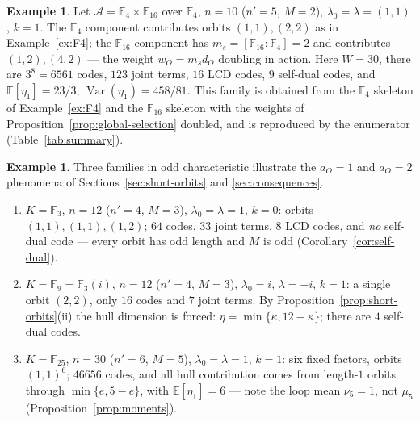 \documentclass[11pt,a4paper]{article}
\newcommand{\F}{\mathbb F}
\newcommand{\A}{\mathcal A}
\numberwithin{equation}{section}
\theoremstyle{plain}
\theoremstyle{definition}
\newtheorem{example}[theorem]{Example}
\theoremstyle{remark}
\begin{document}
\begin{example}\label{ex:mixed}
Let $\A=\F_4\times\F_{16}$ over $\F_4$, $n=10$ ($n'=5$, $M=2$),
$\lambda_0=\lambda=(1,1)$, $k=1$.  The $\F_4$ component contributes orbits
$(1,1),(2,2)$ as in Example~\ref{ex:F4}; the $\F_{16}$ component has
$m_s=[\F_{16}:\F_4]=2$ and contributes $(1,2),(4,2)$ --- the weight
$w_O=m_sd_O$ doubling in action.  Here $W=30$, there are $3^8=6561$ codes,
$123$ joint terms, $16$ LCD codes, $9$ self-dual codes, and
$\mathbb{E}[\eta_1]=23/3$, $\operatorname{Var}(\eta_1)=458/81$.  This family
is obtained from the $\F_4$ skeleton of Example~\ref{ex:F4} and the
$\F_{16}$ skeleton with the weights of Proposition~\ref{prop:global-selection}
doubled, and is reproduced by the enumerator (Table~\ref{tab:summary}).
\end{example}

\begin{example}\label{ex:char35}
Three families in odd characteristic illustrate the $a_O=1$ and $a_O=2$
phenomena of Sections~\ref{sec:short-orbits} and
\ref{sec:consequences}.
\begin{enumerate}
\item[\textup{(a)}] $K=\F_3$, $n=12$ ($n'=4$, $M=3$), $\lambda_0=\lambda=1$,
$k=0$: orbits $(1,1),(1,1),(1,2)$; $64$ codes, $33$ joint terms, $8$ LCD
codes, and \emph{no} self-dual code --- every orbit has odd length and $M$
is odd (Corollary~\ref{cor:self-dual}).
\item[\textup{(b)}] $K=\F_9=\F_3(i)$, $n=12$ ($n'=4$, $M=3$),
$\lambda_0=i$, $\lambda=-i$, $k=1$: a single orbit $(2,2)$, only $16$ codes
and $7$ joint terms.  By Proposition~\ref{prop:short-orbits}(ii) the hull
dimension is forced: $\eta=\min\{\kappa,12-\kappa\}$; there are $4$ self-dual
codes.
\item[\textup{(c)}] $K=\F_{25}$, $n=30$ ($n'=6$, $M=5$),
$\lambda_0=\lambda=1$, $k=1$: six fixed factors, orbits $(1,1)^6$; $46656$
codes, and all hull contribution comes from length-$1$ orbits through
$\min\{e,5-e\}$, with $\mathbb{E}[\eta_1]=6$ --- note the loop mean
$\nu_5=1$, not $\mu_5$ (Proposition~\ref{prop:moments}).
\end{enumerate}
\end{example}
\end{document}
